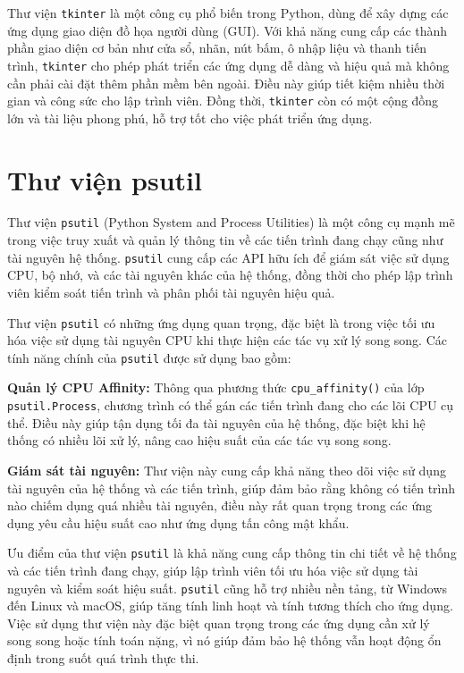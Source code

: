 \documentclass[../DoAn.tex]{subfiles}
\begin{document}
Thư viện \verb|tkinter| là một công cụ phổ biến trong Python, dùng để xây dựng các ứng dụng giao diện đồ họa người dùng (GUI). Với khả năng cung cấp các thành phần giao diện cơ bản như cửa sổ, nhãn, nút bấm, ô nhập liệu và thanh tiến trình, \verb|tkinter| cho phép phát triển các ứng dụng dễ dàng và hiệu quả mà không cần phải cài đặt thêm phần mềm bên ngoài. Điều này giúp tiết kiệm nhiều thời gian và công sức cho lập trình viên. Đồng thời, \verb|tkinter| còn có một cộng đồng lớn và tài liệu phong phú, hỗ trợ tốt cho việc phát triển ứng dụng.

\section{Thư viện psutil} 
\label{section:3.5}

Thư viện \verb|psutil| (Python System and Process Utilities) là một công cụ mạnh mẽ trong việc truy xuất và quản lý thông tin về các tiến trình đang chạy cũng như tài nguyên hệ thống. \verb|psutil| cung cấp các API hữu ích để giám sát việc sử dụng CPU, bộ nhớ, và các tài nguyên khác của hệ thống, đồng thời cho phép lập trình viên kiểm soát tiến trình và phân phối tài nguyên hiệu quả.

Thư viện \verb|psutil| có những ứng dụng quan trọng, đặc biệt là trong việc tối ưu hóa việc sử dụng tài nguyên CPU khi thực hiện các tác vụ xử lý song song. Các tính năng chính của \verb|psutil| được sử dụng bao gồm:

\textbf{Quản lý CPU Affinity:} Thông qua phương thức \verb|cpu_affinity()| của lớp \verb|psutil.Process|, chương trình có thể gán các tiến trình đang cho các lõi CPU cụ thể. Điều này giúp tận dụng tối đa tài nguyên của hệ thống, đặc biệt khi hệ thống có nhiều lõi xử lý, nâng cao hiệu suất của các tác vụ song song.

\textbf{Giám sát tài nguyên:} Thư viện này cung cấp khả năng theo dõi việc sử dụng tài nguyên của hệ thống và các tiến trình, giúp đảm bảo rằng không có tiến trình nào chiếm dụng quá nhiều tài nguyên, điều này rất quan trọng trong các ứng dụng yêu cầu hiệu suất cao như ứng dụng tấn công mật khẩu.

Ưu điểm của thư viện \verb|psutil| là khả năng cung cấp thông tin chi tiết về hệ thống và các tiến trình đang chạy, giúp lập trình viên tối ưu hóa việc sử dụng tài nguyên và kiểm soát hiệu suất. \verb|psutil| cũng hỗ trợ nhiều nền tảng, từ Windows đến Linux và macOS, giúp tăng tính linh hoạt và tính tương thích cho ứng dụng. Việc sử dụng thư viện này đặc biệt quan trọng trong các ứng dụng cần xử lý song song hoặc tính toán nặng, vì nó giúp đảm bảo hệ thống vẫn hoạt động ổn định trong suốt quá trình thực thi.
\end{document}

